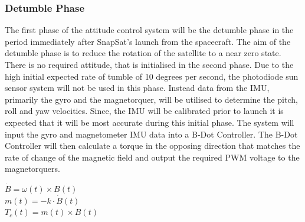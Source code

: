 \subsubsection{Detumble Phase}
The first phase of the attitude control system will be the detumble phase in the period immediately after SnapSat's launch from the spacecraft.  The aim of the detumble phase is to reduce the rotation of the satellite to a near zero state.  There is no required attitude, that is  initialised in the second phase. Due to the high initial expected rate of tumble of 10 degrees per second, the photodiode sun sensor system will not be used in this phase.  Instead data from the IMU, primarily the gyro and the magnetorquer, will be utilised to determine the pitch, roll and yaw velocities.  Since, the IMU will be calibrated prior to launch it is expected that it will be most accurate during this initial phase.  The system will input the gyro and magnetometer IMU data into a B-Dot Controller. The B-Dot Controller will then calculate a torque in the opposing direction that matches the rate of change of the magnetic field and output the required PWM voltage to the magnetorquers.\\
\begin{center}
    $\dot{B} = \omega(t) \times B(t)$\\
    $m(t) = -k \cdot \dot{B}(t)$\\
    $T_c(t) = m(t) \times B(t)$
\end{center}
